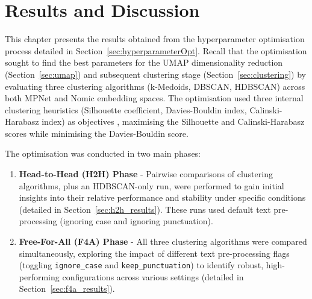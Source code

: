 \documentclass[10pt,oneside]{report}
\begin{document}
%
%
%

\chapter{Results and Discussion}\label{chap:results}

This chapter presents the results obtained from the hyperparameter optimisation process detailed in Section~\ref{sec:hyperparameterOpt}. Recall that the optimisation sought to find the best parameters for the UMAP dimensionality reduction (Section~\ref{sec:umap}) and subsequent clustering stage (Section~\ref{sec:clustering}) by evaluating three clustering algorithms (k-Medoids, DBSCAN, HDBSCAN) across both MPNet and Nomic embedding spaces. The optimisation used three internal clustering heuristics (Silhouette coefficient, Davies-Bouldin index, Calinski-Harabasz index) as objectives \cite{rousseeuw1987silhouettes, davies1979cluster, calinski1974dendrite}, maximising the Silhouette and Calinski-Harabasz scores while minimising the Davies-Bouldin score. 

The optimisation was conducted in two main phases:
\begin{enumerate}
    \item \textbf{Head-to-Head (H2H) Phase} - Pairwise comparisons of clustering algorithms, plus an HDBSCAN-only run, were performed to gain initial insights into their relative performance and stability under specific conditions (detailed in Section~\ref{sec:h2h_results}). These runs used default text pre-processing (ignoring case and ignoring punctuation).
    \item \textbf{Free-For-All (F4A) Phase} - All three clustering algorithms were compared simultaneously, exploring the impact of different text pre-processing flags (toggling \texttt{ignore\_case} and \texttt{keep\_punctuation}) to identify robust, high-performing configurations across various settings (detailed in Section~\ref{sec:f4a_results}).
\end{enumerate}
\end{document}
